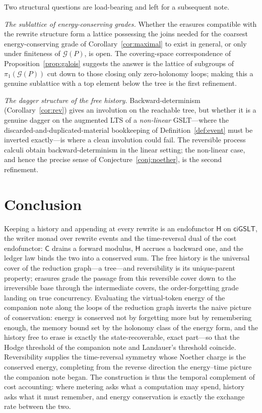 \documentclass[11pt]{article}
\theoremstyle{definition}
\theoremstyle{plain}
\theoremstyle{remark}
\newcommand{\cost}{\mathsf{C}}
\newcommand{\hist}{\mathsf{H}}
\newcommand{\ciGSLT}{\mathsf{ciGSLT}}
\newcommand{\Grph}{\mathcal{G}}
\newcommand{\fund}{\pi_1}
\begin{document}
Two structural questions are load-bearing and left for a subsequent note.

\emph{The sublattice of energy-conserving grades.} Whether the erasures compatible with the rewrite
structure form a lattice possessing the joins needed for the coarsest energy-conserving grade of
Corollary~\ref{cor:maximal} to exist in general, or only under finiteness of $\Grph(P)$, is open.
The covering-space correspondence of Proposition~\ref{prop:galois} suggests the answer is the
lattice of subgroups of $\fund(\Grph(P))$ cut down to those closing only zero-holonomy loops; making
this a genuine sublattice with a top element below the tree is the first refinement.

\emph{The dagger structure of the free history.} Backward-determinism (Corollary~\ref{cor:rev})
gives an involution on the reachable tree, but whether it is a genuine dagger on the augmented LTS
of a \emph{non-linear} GSLT---where the discarded-and-duplicated-material bookkeeping of
Definition~\ref{def:event} must be inverted exactly---is where a clean involution could fail. The
reversible process calculi \cite{CCSK,RCCS} obtain backward-determinism in the linear setting; the
non-linear case, and hence the precise sense of Conjecture~\ref{conj:noether}, is the second
refinement.

\section*{Conclusion}

Keeping a history and appending at every rewrite is an endofunctor $\hist$ on $\ciGSLT$, the writer
monad over rewrite events and the time-reversal dual of the cost endofunctor: $\cost$ drains a
forward modulus, $\hist$ accrues a backward one, and the ledger law binds the two into a conserved
sum. The free history is the universal cover of the reduction graph---a tree---and reversibility is
its unique-parent property; erasures grade the passage from this reversible cover down to the
irreversible base through the intermediate covers, the order-forgetting grade landing on true
concurrency. Evaluating the virtual-token energy of the companion note along the loops of the
reduction graph inverts the naive picture of conservation: energy is conserved not by forgetting
more but by remembering enough, the memory bound set by the holonomy class of the energy form, and
the history free to erase is exactly the state-recoverable, exact part---so that the Hodge threshold
of the companion note and Landauer's threshold coincide. Reversibility supplies the time-reversal
symmetry whose Noether charge is the conserved energy, completing from the reverse direction the
energy--time picture the companion note began. The construction is thus the temporal complement of
cost accounting: where metering asks what a computation may spend, history asks what it must
remember, and energy conservation is exactly the exchange rate between the two.
\end{document}
